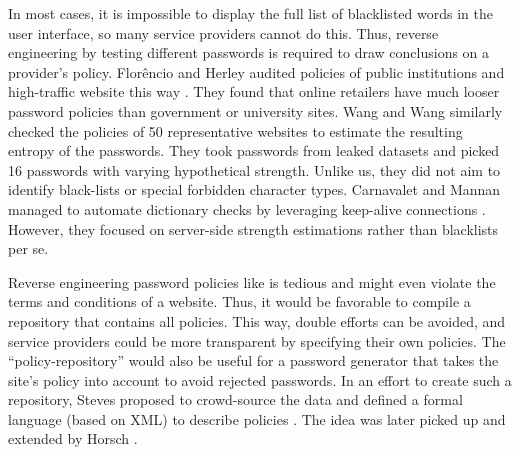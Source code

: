 In most cases, it is impossible to display the full list of blacklisted words in the user interface, so many service providers cannot do this. Thus, reverse engineering by testing different passwords is required to draw conclusions on a provider's policy. Florêncio and Herley audited policies of public institutions and high-traffic website this way \cite{Florencio2010WhereDoPoliciesComeFrom}. They found that online retailers have much looser password policies than government or university sites. Wang and Wang similarly checked the policies of 50 representative websites \cite{Wang2015EmperorsPolicies} to estimate the resulting entropy of the passwords. They took passwords from leaked datasets and picked 16 passwords with varying hypothetical strength. Unlike us, they did not aim to identify black-lists or special forbidden character types. Carnavalet and Mannan managed to automate dictionary checks by leveraging keep-alive connections \cite{Carnavalet2014AnalyzingPWStrengthMeters}. However, they focused on server-side strength estimations rather than blacklists per se. 

Reverse engineering password policies like is tedious and might even violate the terms and conditions of a website. Thus, it would be favorable to compile a repository that contains all policies. This way, double efforts can be avoided, and service providers could be more transparent by specifying their own policies. The ``policy-repository'' would also be useful for a password generator that takes the site's policy into account to avoid rejected passwords. In an effort to create such a repository, Steves \etal proposed to crowd-source the data and defined a formal language (based on XML) to describe policies \cite{Steves2015PasswordPolicyLanguage}. The idea was later picked up and extended by Horsch \etal \cite{Horsch2016PasswordPolicyMarkup}. %


